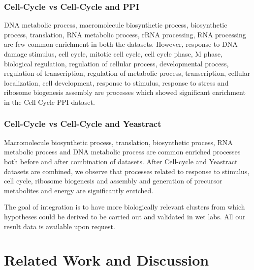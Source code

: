 \subsubsection{Cell-Cycle vs Cell-Cycle and PPI}
DNA metabolic process, macromolecule biosynthetic process, biosynthetic process, translation, RNA metabolic process, rRNA processing, 
RNA processing are few common enrichment in both the datasets. However, response to DNA damage stimulus, cell cycle, mitotic cell cycle, 
cell cycle phase, M phase, biological regulation, regulation of cellular process, developmental process, regulation of transcription, 
regulation of metabolic process, transcription, cellular localization, cell development, response to stimulus, response to 
stress and ribosome biogenesis assembly are processes which showed significant enrichment in the Cell Cycle PPI dataset.

\subsubsection{Cell-Cycle vs Cell-Cycle and Yeastract}
Macromolecule biosynthetic process, translation, biosynthetic process, RNA metabolic process and DNA metabolic process are common enriched processes 
both before and after combination of datasets. After Cell-cycle and Yeastract datasets are combined, we observe that processes related to response to stimulus, 
cell cycle, ribosome biogenesis and assembly and generation of precursor metabolites and energy are significantly enriched.

The goal of integration is to have more biologically relevant clusters from which hypotheses could be derived to be carried out and validated in wet labs. 
All our result data is available upon request. 

\section{Related Work and Discussion}

